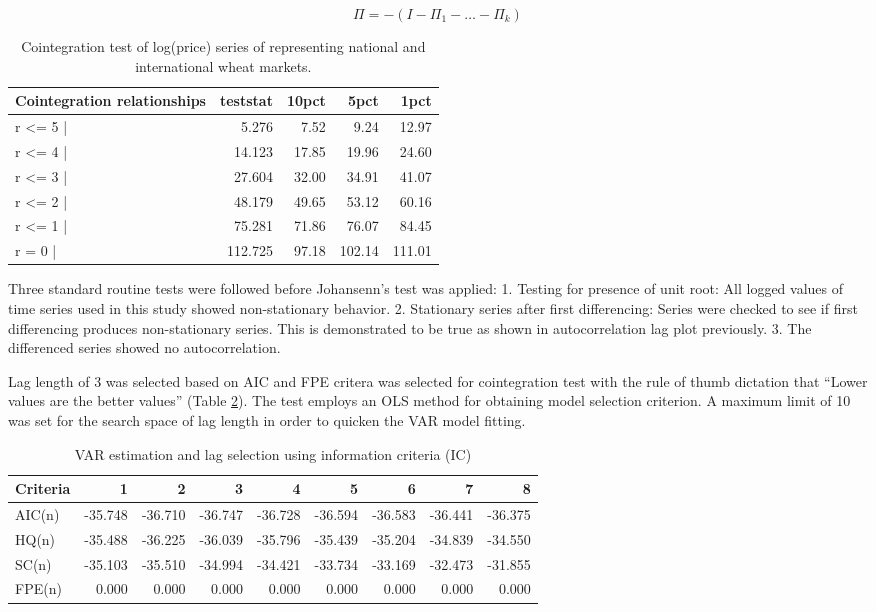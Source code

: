 \documentclass[12pt,]{article}
\begin{document}
\[
\Pi = -(I - \Pi_1 - \ldots - \Pi_k)
\]

\begin{table}

\caption{\label{tab:wheat-cajo-test}Cointegration test of log(price) series of representing national and international wheat markets.}
\centering
\begin{tabular}[t]{lrrrr}
\toprule
Cointegration relationships & teststat & 10pct & 5pct & 1pct\\
\midrule
r <= 5 | & 5.276 & 7.52 & 9.24 & 12.97\\
r <= 4 | & 14.123 & 17.85 & 19.96 & 24.60\\
r <= 3 | & 27.604 & 32.00 & 34.91 & 41.07\\
r <= 2 | & 48.179 & 49.65 & 53.12 & 60.16\\
r <= 1 | & 75.281 & 71.86 & 76.07 & 84.45\\
\addlinespace
r = 0  | & 112.725 & 97.18 & 102.14 & 111.01\\
\bottomrule
\end{tabular}
\end{table}

Three standard routine tests were followed before Johansenn's test was applied:
1. Testing for presence of unit root: All logged values of time series used in this study showed non-stationary behavior.
2. Stationary series after first differencing: Series were checked to see if first differencing produces non-stationary series. This is demonstrated to be true as shown in autocorrelation lag plot previously.
3. The differenced series showed no autocorrelation.

Lag length of 3 was selected based on AIC and FPE critera was selected for cointegration test with the rule of thumb dictation that ``Lower values are the better values'' (Table \ref{tab:wheat-cajo-lag-selection}). The test employs an OLS method for obtaining model selection criterion. A maximum limit of 10 was set for the search space of lag length in order to quicken the VAR model fitting.

\begin{table}

\caption{\label{tab:wheat-cajo-lag-selection}VAR estimation and lag selection using information criteria (IC)}
\centering
\begin{tabular}[t]{lrrrrrrrr}
\toprule
Criteria & 1 & 2 & 3 & 4 & 5 & 6 & 7 & 8\\
\midrule
AIC(n) & -35.748 & -36.710 & -36.747 & -36.728 & -36.594 & -36.583 & -36.441 & -36.375\\
HQ(n) & -35.488 & -36.225 & -36.039 & -35.796 & -35.439 & -35.204 & -34.839 & -34.550\\
SC(n) & -35.103 & -35.510 & -34.994 & -34.421 & -33.734 & -33.169 & -32.473 & -31.855\\
FPE(n) & 0.000 & 0.000 & 0.000 & 0.000 & 0.000 & 0.000 & 0.000 & 0.000\\
\bottomrule
\end{tabular}
\end{table}
\end{document}
